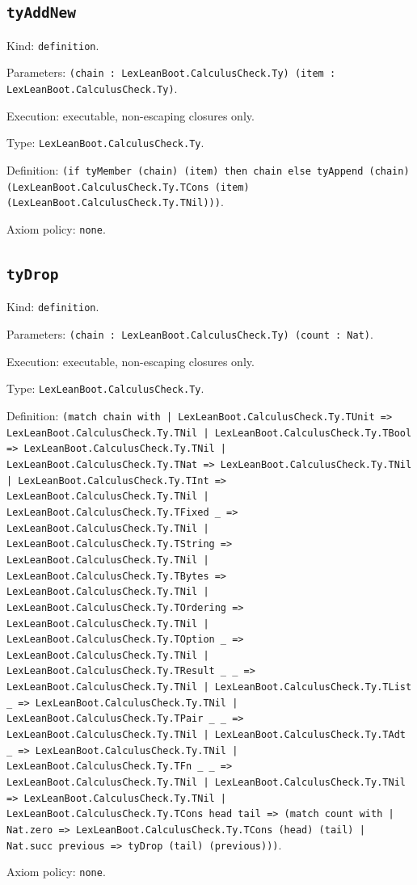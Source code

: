 \documentclass[11pt]{article}
\begin{document}
\subsection*{\texttt{tyAddNew}}
\noindent Kind: \texttt{definition}.\par
\noindent Parameters: \texttt{(chain : LexLeanBoot.CalculusCheck.Ty) (item : LexLeanBoot.CalculusCheck.Ty)}.\par
\noindent Execution: executable, non-escaping closures only.\par
\noindent Type: \texttt{LexLeanBoot.CalculusCheck.Ty}.\par
\noindent Definition: \texttt{(if tyMember (chain) (item) then chain else tyAppend (chain) (LexLeanBoot.CalculusCheck.Ty.TCons (item) (LexLeanBoot.CalculusCheck.Ty.TNil)))}.\par
\noindent Axiom policy: \texttt{none}.\par
\subsection*{\texttt{tyDrop}}
\noindent Kind: \texttt{definition}.\par
\noindent Parameters: \texttt{(chain : LexLeanBoot.CalculusCheck.Ty) (count : Nat)}.\par
\noindent Execution: executable, non-escaping closures only.\par
\noindent Type: \texttt{LexLeanBoot.CalculusCheck.Ty}.\par
\noindent Definition: \texttt{(match chain with | LexLeanBoot.CalculusCheck.Ty.TUnit => LexLeanBoot.CalculusCheck.Ty.TNil | LexLeanBoot.CalculusCheck.Ty.TBool => LexLeanBoot.CalculusCheck.Ty.TNil | LexLeanBoot.CalculusCheck.Ty.TNat => LexLeanBoot.CalculusCheck.Ty.TNil | LexLeanBoot.CalculusCheck.Ty.TInt => LexLeanBoot.CalculusCheck.Ty.TNil | LexLeanBoot.CalculusCheck.Ty.TFixed \_ => LexLeanBoot.CalculusCheck.Ty.TNil | LexLeanBoot.CalculusCheck.Ty.TString => LexLeanBoot.CalculusCheck.Ty.TNil | LexLeanBoot.CalculusCheck.Ty.TBytes => LexLeanBoot.CalculusCheck.Ty.TNil | LexLeanBoot.CalculusCheck.Ty.TOrdering => LexLeanBoot.CalculusCheck.Ty.TNil | LexLeanBoot.CalculusCheck.Ty.TOption \_ => LexLeanBoot.CalculusCheck.Ty.TNil | LexLeanBoot.CalculusCheck.Ty.TResult \_ \_ => LexLeanBoot.CalculusCheck.Ty.TNil | LexLeanBoot.CalculusCheck.Ty.TList \_ => LexLeanBoot.CalculusCheck.Ty.TNil | LexLeanBoot.CalculusCheck.Ty.TPair \_ \_ => LexLeanBoot.CalculusCheck.Ty.TNil | LexLeanBoot.CalculusCheck.Ty.TAdt \_ => LexLeanBoot.CalculusCheck.Ty.TNil | LexLeanBoot.CalculusCheck.Ty.TFn \_ \_ => LexLeanBoot.CalculusCheck.Ty.TNil | LexLeanBoot.CalculusCheck.Ty.TNil => LexLeanBoot.CalculusCheck.Ty.TNil | LexLeanBoot.CalculusCheck.Ty.TCons head tail => (match count with | Nat.zero => LexLeanBoot.CalculusCheck.Ty.TCons (head) (tail) | Nat.succ previous => tyDrop (tail) (previous)))}.\par
\noindent Axiom policy: \texttt{none}.\par
\end{document}
